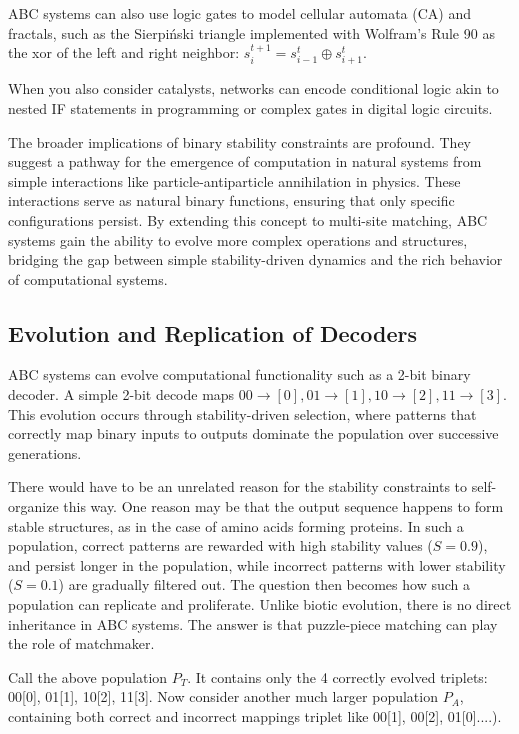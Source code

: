 \documentclass[entropy,article,submit,pdftex,moreauthors]{Definitions/mdpi}
\begin{document}
ABC systems can also use logic gates to model cellular automata (CA) and fractals, such as the Sierpiński triangle implemented with Wolfram's Rule 90 \cite{wolfram1983statistical} as the xor of the left and right neighbor: 
\( s_{i}^{t+1} = s_{i-1}^t \oplus s_{i+1}^t \).

When you also consider catalysts, networks can encode conditional logic akin to nested IF statements in programming or complex gates in digital logic circuits. 

The broader implications of binary stability constraints are profound. They suggest a pathway for the emergence of computation in natural systems from simple interactions like particle-antiparticle annihilation in physics. These interactions serve as natural binary functions, ensuring that only specific configurations persist. By extending this concept to multi-site matching, ABC systems gain the ability to evolve more complex operations and structures, bridging the gap between simple stability-driven dynamics and the rich behavior of computational systems.

\subsection{Evolution and Replication of Decoders}

ABC systems can evolve computational functionality such as a 2-bit binary decoder. A simple 2-bit decode maps \(00 \to [0], 01 \to [1], 10 \to [2], 11 \to [3]\). This evolution occurs through stability-driven selection, where patterns that correctly map binary inputs to outputs dominate the population over successive generations. 

There would have to be an unrelated reason for the stability constraints to self-organize this way. One reason may be that the output sequence happens to form stable structures, as in the case of amino acids  forming proteins. In such a population, correct patterns are rewarded with high stability values (\( S=0.9 \)), and persist longer in the population, while incorrect patterns with lower stability (\( S=0.1 \)) are gradually filtered out. The question then becomes how such a population can replicate and proliferate. Unlike biotic evolution, there is no direct inheritance in ABC systems. The answer is that puzzle-piece matching can play the role of matchmaker.

Call the above population \( P_T \). It contains only the 4 correctly evolved triplets: 
00[0], 01[1], 10[2], 11[3]. Now consider another much larger population \( P_A \), containing both correct and incorrect mappings triplet like  00[1], 00[2], 01[0]....).
\end{document}
